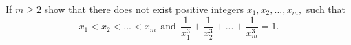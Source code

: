 If $m\geq 2$ show that there does not exist positive  integers $x_1, x_2, ..., x_m,$ such that \[x_1< x_2<...< x_m \ \ \text{and} \ \ \frac{1}{x_1^3}+\frac{1}{x_2^3}+...+\frac{1}{x_m^3}=1.\]